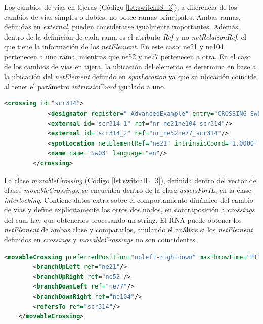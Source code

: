     Los cambios de vías en tijeras (Código \ref{lst:switchIS_3}), a diferencia de los cambios de vías simples o dobles, no posee ramas principales. Ambas ramas, definidas en \textit{external}, pueden considerarse igualmente importantes. Además, dentro de la definición de cada rama es el atributo \textit{Ref} y no \textit{netRelationRef}, el que tiene la información de los \textit{netElement}. En este caso: ne21 y ne104 pertenecen a una rama, mientras que ne52 y ne77 pertenecen a otra. En el caso de los cambios de vías en tijera, la ubicación del elemento se determina en base a la ubicación del \textit{netElement} definido en \textit{spotLocation} ya que su ubicación coincide al tener el parámetro \textit{intrinsicCoord} igualado a uno.
    
    \begin{lstlisting}[language = XML, caption = Clase \textit{Crossing} , label = {lst:switchIS_3}]
    	<crossing id="scr314">
	    	<designator register="_AdvancedExample" entry="CROSSING Sw03"/>
	    	<external id="scr314_1" ref="nr_ne21ne104_scr314"/>
	    	<external id="scr314_2" ref="nr_ne52ne77_scr314"/>
	    	<spotLocation netElementRef="ne21" intrinsicCoord="1.0000" applicationDirection="normal" id="scr314_sloc01"/>
	    	<name name="Sw03" language="en"/>
    	</crossing>
    \end{lstlisting}
        
    La clase \textit{movableCrossing} (Código \ref{lst:switchIL_3}), definida dentro del vector de clases \textit{movableCrossings}, se encuentra dentro de la clase \textit{assetsForIL}, en la clase \textit{interlocking}. Contiene datos extra sobre el comportamiento dinámico del cambio de vías y define explícitamente los otros dos nodos, en contraposición a \textit{crossings} del cual hay que obtenerlos procesando un string. El RNA puede obtener los \textit{netElement} de ambas clase y compararlos, anulando el análisis si los \textit{netElement} definidos en \textit{crossings} y \textit{movableCrossings} no son coincidentes.
    
    \begin{lstlisting}[language = XML, caption = Clase \textit{movableCrossing}, label = {lst:switchIL_3}]
	    <movableCrossing preferredPosition="upleft-rightdown" maxThrowTime="PT10S" returnsToPreferredPosition="false" isKeyLocked="false" id="il_scr314">
	    <branchUpLeft ref="ne21"/>
	    <branchUpRight ref="ne52"/>
	    <branchDownLeft ref="ne77"/>
	    <branchDownRight ref="ne104"/>
	    <refersTo ref="scr314"/>
    </movableCrossing>
    \end{lstlisting}
        
